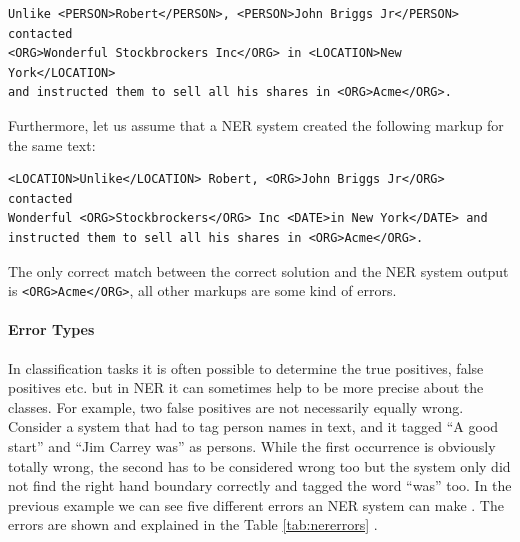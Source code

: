 \documentclass[a4paper,twoside]{book}      %
\begin{document}
\begin{verbatim}
Unlike <PERSON>Robert</PERSON>, <PERSON>John Briggs Jr</PERSON> contacted 
<ORG>Wonderful Stockbrockers Inc</ORG> in <LOCATION>New York</LOCATION> 
and instructed them to sell all his shares in <ORG>Acme</ORG>.
\end{verbatim}

Furthermore, let us assume that a NER system created the following markup \cite{nadeau2007yooname} for the same text:

\begin{verbatim}
<LOCATION>Unlike</LOCATION> Robert, <ORG>John Briggs Jr</ORG> contacted 
Wonderful <ORG>Stockbrockers</ORG> Inc <DATE>in New York</DATE> and 
instructed them to sell all his shares in <ORG>Acme</ORG>.
\end{verbatim}

The only correct match between the correct solution and the NER system output is \verb$<ORG>Acme</ORG>$, all other markups are some kind of errors.

\paragraph{Error Types}
In classification tasks it is often possible to determine the true positives, false positives etc. but in NER it can sometimes help to be more precise about the classes. For example, two false positives are not necessarily equally wrong. Consider a system that had to tag person names in text, and it tagged ``A good start'' and ``Jim Carrey was'' as persons. While the first occurrence is obviously totally wrong, the second has to be considered wrong too but the system only did not find the right hand boundary correctly and tagged the word ``was'' too.
In the previous example we can see five different errors an NER system can make \cite{manning2006nererrors}. The errors are shown and explained in the Table \ref{tab:nererrors} \cite{nadeau2007yooname}.
\end{document}
